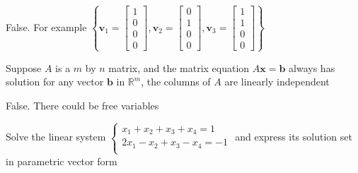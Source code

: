 \documentclass[a4paper,10pt]{article}
\begin{document}
\begin{solution}
False. For example $\left\{\mathbf v_1=\begin{bmatrix}
1\\0\\0\\0
\end{bmatrix},\mathbf v_2=\begin{bmatrix}
0\\1\\0\\0
\end{bmatrix},\mathbf v_3=\begin{bmatrix}
1\\1\\0\\0
\end{bmatrix}\right\}$
\end{solution}

\begin{problem}
Suppose $A$ is a $m$ by $n$ matrix, and the matrix equation $A\mathbf x=\mathbf b$ always has solution for any vector $\mathbf b$ in $\mathbb R^m$, the columns of $A$ are linearly independent
\end{problem}

\begin{solution}
False. There could be free variables
\end{solution}

\begin{problem}
Solve the linear system $\begin{cases}
x_1+x_2+x_3+x_4=1\\
2x_1-x_2+x_3-x_4=-1\\
\end{cases}$ and express its solution set in parametric vector form
\end{problem}
\end{document}
